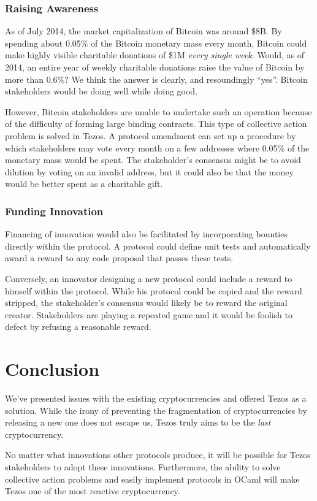 \documentclass[letterpaper]{article}
\begin{document}
\subsubsection{Raising Awareness}

As of July 2014, the market capitalization of Bitcoin was around \$8B.
By spending about 0.05\% of the Bitcoin monetary mass every month,
Bitcoin could make highly visible
charitable donations of \$1M \emph{every single week}.
Would, as of 2014, an entire year of weekly charitable donations
raise the value of Bitcoin by more than 0.6\%?
We think the answer is clearly, and resoundingly ``yes''.
Bitcoin stakeholders would be doing well while doing good.

However, Bitcoin stakeholders are unable to undertake such an operation
because of the difficulty of forming large binding contracts. This type
of collective action problem is solved in Tezos.
A protocol amendment can set up a procedure by which
stakeholders may vote every month on a few addresses
where 0.05\% of the monetary mass would be spent.
The stakeholder's consensus might be to avoid dilution
by voting on an invalid address,
but it could also be that the money would be better spent as a charitable gift.

\subsubsection{Funding Innovation}

Financing of innovation would also be facilitated
by incorporating bounties directly within the protocol.
A protocol could define unit tests and automatically award a reward
to any code proposal that passes these tests.

Conversely, an innovator designing a new protocol
could include a reward to himself within the protocol.
While his protocol could be copied and the reward stripped,
the stakeholder's consensus would likely be to reward the original creator.
Stakeholders are playing a repeated game
and it would be foolish to defect by refusing a reasonable reward.


\section*{Conclusion}

We've presented issues with the existing cryptocurrencies
and offered Tezos as a solution.
While the irony of preventing the fragmentation of cryptocurrencies
by releasing a new one does not escape us,%
Tezos truly aims to be the \emph{last} cryptocurrency.

No matter what innovations other protocols produce,
it will be possible for Tezos stakeholders to adopt these innovations.
Furthermore, the ability to solve collective action problems
and easily implement protocols in OCaml will make Tezos one of the most reactive cryptocurrency.



\end{document}
